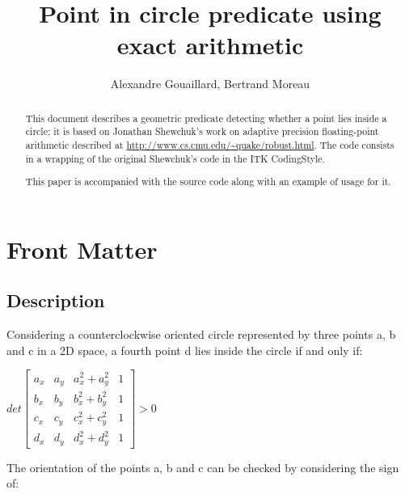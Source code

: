 \documentclass{InsightArticle}
\title{Point in circle predicate using exact arithmetic}
\author{Alexandre Gouaillard, Bertrand Moreau}
\newcommand{\IJhandlerIDnumber}{1338}
\begin{document}
\ifpdf
\else
\fi
\maketitle
\ifhtml
\chapter*{Front Matter\label{front}}
\fi

\begin{abstract}
\noindent
This document describes a geometric predicate detecting whether a point lies
inside a circle; it is based on Jonathan Shewchuk's work on adaptive precision
floating-point arithmetic described at 
\url{http://www.cs.cmu.edu/~quake/robust.html}. 
The code consists in a wrapping of the original Shewchuk's code in the ITK
CodingStyle.

This paper is accompanied with the source code along with an example of usage
for it.

\end{abstract}

\IJhandlenote{\IJhandlerIDnumber}
\tableofcontents
\pagebreak

\section{Description}
Considering a counterclockwise oriented circle represented by three points a,
b and c in a 2D space, a fourth point d lies inside the circle if and only if:

\begin{math}
det
\begin{bmatrix}
a_x & a_y & a_x^2+a_y^2 & 1 \\
b_x & b_y & b_x^2+b_y^2 & 1 \\
c_x & c_y & c_x^2+c_y^2 & 1 \\
d_x & d_y & d_x^2+d_y^2 & 1
\end{bmatrix}
>0
\end{math}

The orientation of the points a, b and c can be checked by considering the sign
of:
\end{document}
